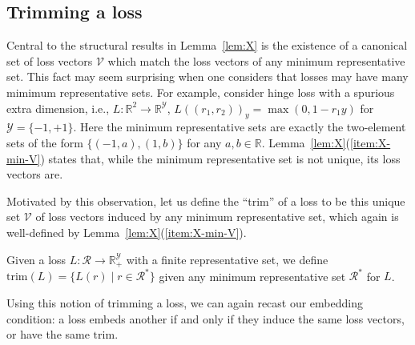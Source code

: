 \documentclass[twoside,11pt]{article}
\newcommand{\reals}{\mathbb{R}}
\newcommand{\R}{\mathcal{R}}
\newcommand{\V}{\mathcal{V}}
\newcommand{\Y}{\mathcal{Y}}
\newcommand{\trimcover}{\mathrm{trim}}
\begin{document}

\subsection{Trimming a loss}
\label{sec:trim}

Central to the structural results in Lemma~\ref{lem:X} is the existence of a canonical set of loss vectors $\V$ which match the loss vectors of any minimum representative set.
This fact may seem surprising when one considers that losses may have many mimimum representative sets.
For example, consider hinge loss with a spurious extra dimension, i.e., $L:\reals^2\to\reals^\Y$, $L((r_1, r_2))_y = \max(0,1-r_1y)$ for $\Y = \{-1,+1\}$.
Here the minimum representative sets are exactly the two-element sets of the form $\{(-1,a),(1,b)\}$ for any $a,b\in\reals$. 
Lemma~\ref{lem:X}(\ref{item:X-min-V}) states that, while the minimum representative set is not unique, its loss vectors are.

Motivated by this observation, let us define the ``trim'' of a loss to be this unique set $\V$ of loss vectors induced by any minimum representative set, which again is well-defined by Lemma~\ref{lem:X}(\ref{item:X-min-V}).
\begin{definition}[Trim]\label{def:trim-loss}
  Given a loss $L:\R \to \reals_+^\Y$ with a finite representative set, we define $\trimcover(L) = \{L(r) \mid r \in \R^*\}$ given any minimum representative set $\R^*$ for $L$.
\end{definition}


Using this notion of trimming a loss, we can again recast our embedding condition: a loss embeds another if and only if they induce the same loss vectors, or have the same $\trimcover$.
\end{document}
